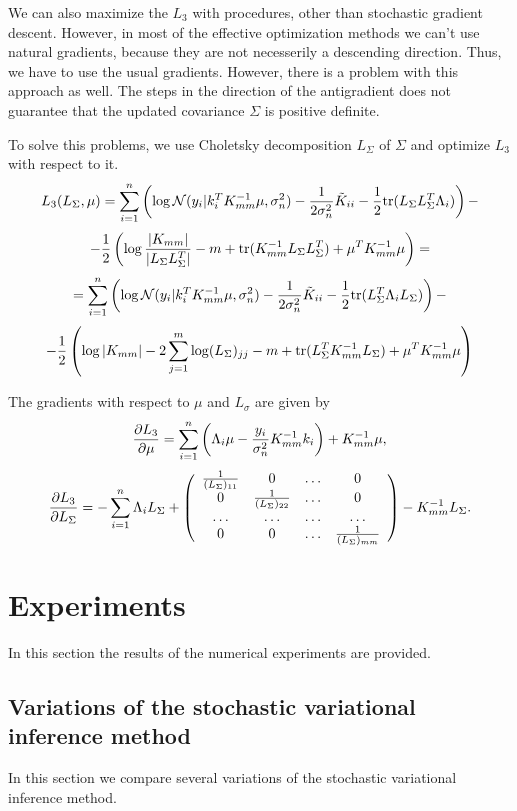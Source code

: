 \documentclass[12pt]{article}
\begin{document}
		We can also maximize the $L_3$ with procedures, other than stochastic gradient descent. However, in most of the effective optimization methods we can't use natural gradients, because they are not necesserily a descending direction. Thus, we have to use the usual gradients. However, there is a problem with this approach as well. The steps in the direction of the antigradient does not guarantee that the updated covariance $\Sigma$ is positive definite. 

		To solve this problems, we use Choletsky decomposition $L_{\Sigma}$ of $\Sigma$ and optimize $L_3$ with respect to it.
		$$L_3(L_{\Sigma}, \mu) = \sum_{i = 1}^{n} \left( \log \mathcal{N}(y_i | k_i^T K_{mm}^{-1} \mu, \sigma_n^2) - \frac 1 {2 \sigma_n^2} \tilde K_{ii} - \frac 1 2 \mbox{tr} (L_{\Sigma} L_{\Sigma}^T \Lambda_i) \right) - $$
		$$ -\frac 1 2 \left (\log \frac {|K_{mm}|} {|L_{\Sigma} L_{\Sigma}^T|} - m + \mbox{tr}(K_{mm}^{-1} L_{\Sigma} L_{\Sigma}^T) + \mu^T K_{mm}^{-1} \mu \right) = $$
		$$ = \sum_{i = 1}^{n} \left( \log \mathcal{N}(y_i | k_i^T K_{mm}^{-1} \mu, \sigma_n^2) - \frac 1 {2 \sigma_n^2} \tilde K_{ii} - \frac 1 2 \mbox{tr} (L_{\Sigma}^T \Lambda_iL_{\Sigma}) \right) - $$
		$$ -\frac 1 2 \left (\log |K_{mm}| - 2 \sum_{j=1}^{m}\log (L_{\Sigma})_{jj} - m + \mbox{tr}(L_{\Sigma}^T K_{mm}^{-1} L_{\Sigma}) + \mu^T K_{mm}^{-1} \mu \right)$$

		The gradients with respect to $\mu$ and $L_{\sigma}$ are given by
		$$
		\frac{\partial L_3}{\partial \mu} =  \sum_{i=1}^n \left(\Lambda_i \mu - \frac {y_i}{\sigma_n^2} K_{mm}^{-1} k_i \right) + K_{mm}^{-1} \mu,
		$$
		$$\frac{\partial L_3}{\partial L_{\Sigma}} = - \sum_{i=1}^n \Lambda_i L_{\Sigma} +
		\left(
		\begin{array}{cccc}
		\frac 1 {(L_{\Sigma})_{11}} & 0 & \ldots & 0\\
		0 & \frac 1 {(L_{\Sigma})_{22}} & \ldots & 0\\
		\ldots & \ldots & \ldots & \ldots\\
		0 & 0 & \ldots & \frac 1 {(L_{\Sigma})_{mm}} \\
		\end{array}   
		\right) 
		- K_{mm}^{-1} L_{\Sigma}.
		$$

	\pagebreak
\section{Experiments}
	In this section the results of the numerical experiments are provided.

	\subsection{Variations of the stochastic variational inference method}
		In this section we compare several variations of the stochastic variational inference method.
\end{document}
